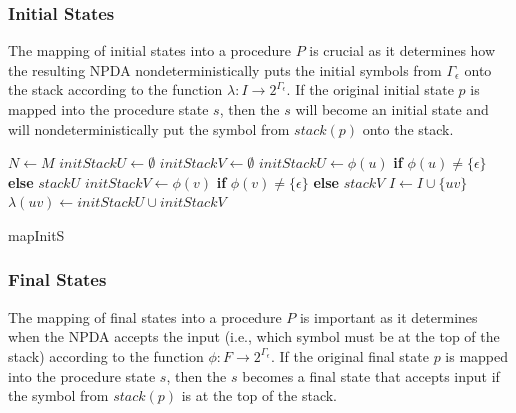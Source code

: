         \subsubsection*{Initial States}
            The mapping of initial states into a procedure $P$ is crucial as it determines how the resulting NPDA nondeterministically puts the initial symbols from $\Gamma_\epsilon$ onto the stack according to the function $\lambda: I \rightarrow 2^{\Gamma_\epsilon}$. If the original initial state $p$ is mapped into the procedure state $s$, then the $s$ will become an initial state and will nondeterministically put the symbol from $stack(p)$ onto the stack.

        \begin{algorithm}
            \footnotesize
            \DontPrintSemicolon
            \setcounter{AlgoLine}{0}

            $N \leftarrow M$\;
            {
                $initStackU \leftarrow \emptyset$\;
                $initStackV \leftarrow \emptyset$\;
                {
                    $initStackU \leftarrow \phi(u)$ \textbf{if} $\phi(u) \neq \{\epsilon\}$ \textbf{else} $stackU$\;
                }
                {
                    $initStackV \leftarrow \phi(v)$ \textbf{if} $\phi(v) \neq \{\epsilon\}$ \textbf{else} $stackV$\;
                }
                {
                    $I \leftarrow I \cup \{uv\}$
                    $\lambda(uv) \leftarrow initStackU \cup initStackV$\;
                }
            }

            \normalsize
            \caption{mapInitS}
        \end{algorithm}

        \subsubsection*{Final States}
            The mapping of final states into a procedure $P$ is important as it determines when the NPDA accepts the input (i.e., which symbol must be at the top of the stack) according to the function $\phi: F \rightarrow 2^{\Gamma_\epsilon}$. If the original final state $p$ is mapped into the procedure state $s$, then the $s$ becomes a final state that accepts input if the symbol from $stack(p)$ is at the top of the stack.

